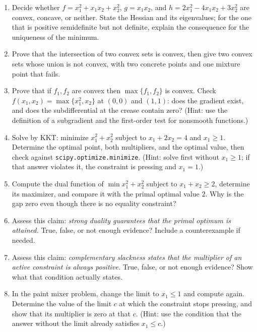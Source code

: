 \begin{latihan}
\begin{enumerate}
  \item Decide whether $f=x_{1}^{2}+x_{1}x_{2}+x_{2}^{2}$, $g=x_{1}x_{2}$, and
        $h=2x_{1}^{2}-4x_{1}x_{2}+3x_{2}^{2}$ are convex, concave, or neither.
        State the Hessian and its eigenvalues; for the one that is positive semidefinite but not
        definite, explain the consequence for the uniqueness of the minimum.

  \item Prove that the intersection of two convex sets is convex, then give two convex sets
        whose union is not convex, with two concrete points and one mixture point that fails.

  \item Prove that if $f_{1},f_{2}$ are convex then $\max\{f_{1},f_{2}\}$ is convex.
        Check $f(x_{1},x_{2})=\max\{x_{1}^{2},x_{2}\}$ at $(0,0)$ and $(1,1)$: does
        the gradient exist, and does the subdifferential at the crease contain zero?
        (Hint: use the definition of a subgradient and the first-order test for nonsmooth
        functions.)

  \item Solve by KKT: minimize $x_{1}^{2}+x_{2}^{2}$ subject to $x_{1}+2x_{2}=4$
        and $x_{1}\ge1$. Determine the optimal point, both multipliers, and the optimal value,
        then check against \texttt{scipy.optimize.minimize}. (Hint: solve first without
        $x_{1}\ge1$; if that answer violates it, the constraint is pressing and $x_{1}=1$.)

  \item Compute the dual function of $\min x_{1}^{2}+x_{2}^{2}$ subject to $x_{1}+x_{2}\ge2$,
        determine its maximizer, and compare it with the primal optimal value $2$. Why is the
        gap zero even though there is no equality constraint?

  \item Assess this claim: \emph{strong duality guarantees that the primal optimum is attained.}
        True, false, or not enough evidence? Include a counterexample if needed.

  \item Assess this claim: \emph{complementary slackness states that the multiplier of an
        active constraint is always positive.} True, false, or not enough evidence? Show what
        that condition actually states.

  \item In the paint mixer problem, change the limit to $x_{1}\le1$ and compute again.
        Determine the value of the limit $c$ at which the constraint stops pressing, and show
        that its multiplier is zero at that $c$. (Hint: use the condition that the answer without
        the limit already satisfies $x_{1}\le c$.)


\end{enumerate}
\end{latihan}
